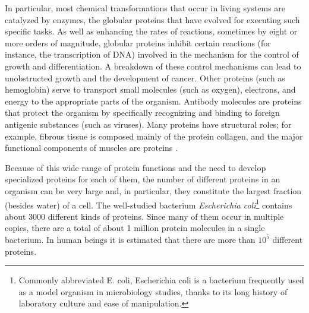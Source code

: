 In particular, most chemical transformations that occur in living systems are catalyzed by enzymes, the globular proteins that have evolved for executing such specific tasks. 
As well as enhancing the rates of reactions, sometimes by eight or more orders of magnitude, globular proteins inhibit certain reactions (for instance, the transcription of DNA) involved in the mechanism for the control of growth and differentiation. A breakdown of these control mechanisms can lead to unobstructed growth and the development of cancer. 
Other proteins (such as hemoglobin) serve to transport small molecules (such as oxygen), electrons, and energy to the appropriate parts of the organism. 
Antibody molecules are proteins that protect the organism by specifically recognizing and binding to foreign antigenic substances (such as viruses). 
Many proteins have structural roles; for example, fibrous tissue is composed mainly of the protein collagen, and the major functional components of muscles are proteins
\cite{brooks1988proteins}.

Because of this wide range of protein functions and the need to develop specialized proteins for each of them, the number of different proteins in an organism can be very large and, in particular, they constitute the largest fraction (besides water) of a cell. The well-studied bacterium \textit{Escherichia coli}\footnote{Commonly abbreviated E. coli, Escherichia coli is a bacterium frequently used as a model organism in microbiology studies, thanks to its long history of laboratory culture and ease of manipulation.} contains about 3000 different kinds of proteins. Since many of them occur in multiple copies, there are a total of about 1 million protein molecules in a single bacterium. In human beings it is estimated that there are more than $10^5$ different proteins.

